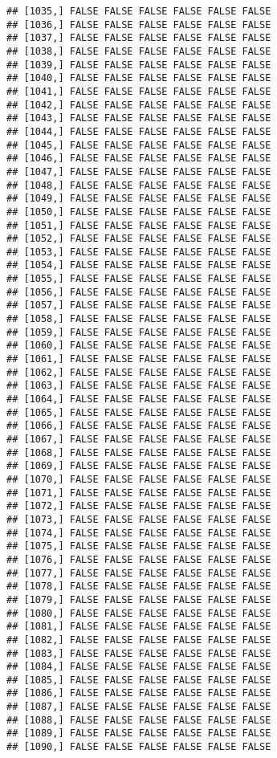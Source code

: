 \documentclass[
]{article}
\begin{document}
\begin{verbatim}
## [1035,] FALSE FALSE FALSE FALSE FALSE FALSE
## [1036,] FALSE FALSE FALSE FALSE FALSE FALSE
## [1037,] FALSE FALSE FALSE FALSE FALSE FALSE
## [1038,] FALSE FALSE FALSE FALSE FALSE FALSE
## [1039,] FALSE FALSE FALSE FALSE FALSE FALSE
## [1040,] FALSE FALSE FALSE FALSE FALSE FALSE
## [1041,] FALSE FALSE FALSE FALSE FALSE FALSE
## [1042,] FALSE FALSE FALSE FALSE FALSE FALSE
## [1043,] FALSE FALSE FALSE FALSE FALSE FALSE
## [1044,] FALSE FALSE FALSE FALSE FALSE FALSE
## [1045,] FALSE FALSE FALSE FALSE FALSE FALSE
## [1046,] FALSE FALSE FALSE FALSE FALSE FALSE
## [1047,] FALSE FALSE FALSE FALSE FALSE FALSE
## [1048,] FALSE FALSE FALSE FALSE FALSE FALSE
## [1049,] FALSE FALSE FALSE FALSE FALSE FALSE
## [1050,] FALSE FALSE FALSE FALSE FALSE FALSE
## [1051,] FALSE FALSE FALSE FALSE FALSE FALSE
## [1052,] FALSE FALSE FALSE FALSE FALSE FALSE
## [1053,] FALSE FALSE FALSE FALSE FALSE FALSE
## [1054,] FALSE FALSE FALSE FALSE FALSE FALSE
## [1055,] FALSE FALSE FALSE FALSE FALSE FALSE
## [1056,] FALSE FALSE FALSE FALSE FALSE FALSE
## [1057,] FALSE FALSE FALSE FALSE FALSE FALSE
## [1058,] FALSE FALSE FALSE FALSE FALSE FALSE
## [1059,] FALSE FALSE FALSE FALSE FALSE FALSE
## [1060,] FALSE FALSE FALSE FALSE FALSE FALSE
## [1061,] FALSE FALSE FALSE FALSE FALSE FALSE
## [1062,] FALSE FALSE FALSE FALSE FALSE FALSE
## [1063,] FALSE FALSE FALSE FALSE FALSE FALSE
## [1064,] FALSE FALSE FALSE FALSE FALSE FALSE
## [1065,] FALSE FALSE FALSE FALSE FALSE FALSE
## [1066,] FALSE FALSE FALSE FALSE FALSE FALSE
## [1067,] FALSE FALSE FALSE FALSE FALSE FALSE
## [1068,] FALSE FALSE FALSE FALSE FALSE FALSE
## [1069,] FALSE FALSE FALSE FALSE FALSE FALSE
## [1070,] FALSE FALSE FALSE FALSE FALSE FALSE
## [1071,] FALSE FALSE FALSE FALSE FALSE FALSE
## [1072,] FALSE FALSE FALSE FALSE FALSE FALSE
## [1073,] FALSE FALSE FALSE FALSE FALSE FALSE
## [1074,] FALSE FALSE FALSE FALSE FALSE FALSE
## [1075,] FALSE FALSE FALSE FALSE FALSE FALSE
## [1076,] FALSE FALSE FALSE FALSE FALSE FALSE
## [1077,] FALSE FALSE FALSE FALSE FALSE FALSE
## [1078,] FALSE FALSE FALSE FALSE FALSE FALSE
## [1079,] FALSE FALSE FALSE FALSE FALSE FALSE
## [1080,] FALSE FALSE FALSE FALSE FALSE FALSE
## [1081,] FALSE FALSE FALSE FALSE FALSE FALSE
## [1082,] FALSE FALSE FALSE FALSE FALSE FALSE
## [1083,] FALSE FALSE FALSE FALSE FALSE FALSE
## [1084,] FALSE FALSE FALSE FALSE FALSE FALSE
## [1085,] FALSE FALSE FALSE FALSE FALSE FALSE
## [1086,] FALSE FALSE FALSE FALSE FALSE FALSE
## [1087,] FALSE FALSE FALSE FALSE FALSE FALSE
## [1088,] FALSE FALSE FALSE FALSE FALSE FALSE
## [1089,] FALSE FALSE FALSE FALSE FALSE FALSE
## [1090,] FALSE FALSE FALSE FALSE FALSE FALSE

\end{verbatim}
\end{document}
